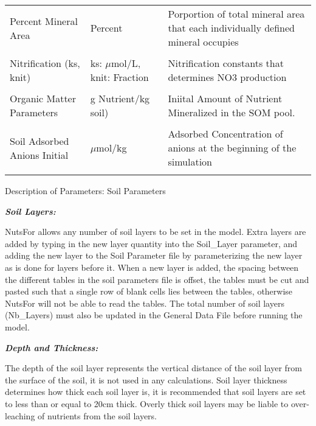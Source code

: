 \documentclass[
]{article}
\begin{document}
\begin{table}[!h]
{\begin{tabular}[t]{lll}
Percent Mineral Area & Percent & Porportion of total mineral area that each individually defined mineral occupies\\
\cellcolor{gray!6}{Uptake Fraction Per Layer (all nutrients)} & \cellcolor{gray!6}{Fraction (max 1)} & \cellcolor{gray!6}{Determines fraction of needed nutrient which stand uptakes from each}\\
Nitrification (ks, knit) & ks: $\mu$mol/L, knit: Fraction & Nitrification constants that determines NO3 production\\
\addlinespace
\cellcolor{gray!6}{Microbial Turnover} & \cellcolor{gray!6}{Multiple of Microbial Pool} & \cellcolor{gray!6}{Determines fraction of SOM which turns over}\\
Organic Matter Parameters & g Nutrient/kg soil) & Iniital Amount of Nutrient Mineralized in the SOM pool.\\
\cellcolor{gray!6}{Soil Solution Initial (Multiple Species)} & \cellcolor{gray!6}{$\mu$mol/L} & \cellcolor{gray!6}{Concentration of all chemical species at beginning of simulation}\\
Soil Adsorbed Anions Initial & $\mu$mol/kg & Adsorbed Concentration of anions at the beginning of the simulation\\
\cellcolor{gray!6}{CEC Initial} & \cellcolor{gray!6}{c${mol}_c$/kg} & \cellcolor{gray!6}{Sorbed Concentration of Cations to the CEC at the beginning of the simulation}\\
\bottomrule
\end{tabular}}
\end{table}

Description of Parameters: Soil Parameters

\textbf{\emph{Soil Layers:}}

NutsFor allows any number of soil layers to be set in the model. Extra
layers are added by typing in the new layer quantity into the
Soil\_Layer parameter, and adding the new layer to the Soil Parameter
file by parameterizing the new layer as is done for layers before it.
When a new layer is added, the spacing between the different tables in
the soil parameters file is offset, the tables must be cut and pasted
such that a single row of blank cells lies between the tables, otherwise
NutsFor will not be able to read the tables. The total number of soil
layers (Nb\_Layers) must also be updated in the General Data File before
running the model.

\textbf{\emph{Depth and Thickness:}}

The depth of the soil layer represents the vertical distance of the soil
layer from the surface of the soil, it is not used in any calculations.
Soil layer thickness determines how thick each soil layer is, it is
recommended that soil layers are set to less than or equal to 20cm
thick. Overly thick soil layers may be liable to over-leaching of
nutrients from the soil layers.
\end{document}
